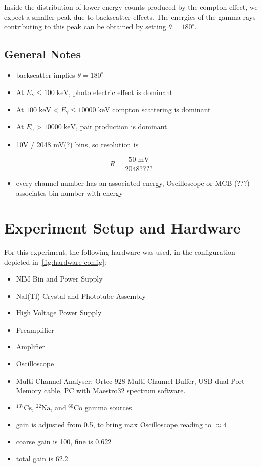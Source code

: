 \documentclass[a4paper]{article}
\begin{document}
Inside the distribution of lower energy counts produced by the compton effect, we expect a smaller peak due to backscatter effects. The energies of the gamma rays contributing to this peak can be obtained by setting $\theta=180^{\circ}$.



\subsection{General Notes}

\begin{itemize}
    \item backscatter implies $\theta=180^{\circ}$
    \item At $E_{\gamma}\leq100\mathrm{\;keV}$, photo electric effect is dominant
    \item At $100\mathrm{\;keV}<E_{\gamma}\leq10000\mathrm{\;keV}$ compton scattering is dominant
    \item At $E_{\gamma}>10000\mathrm{\;keV}$, pair production is dominant
    \item 10V / 2048 mV(?) bins, so resolution is
\end{itemize}
\begin{equation}
    R=\frac{50\;\mathrm{mV}}{2048????}
\end{equation}
\begin{itemize}
    \item every channel number has an associated energy, Oscilloscope or MCB (???) associates bin number with energy
\end{itemize}

\section{Experiment Setup and Hardware}

For this experiment, the following hardware was used, in the configuration depicted in~\autoref{fig:hardware-config}:
\begin{itemize}
    \item NIM Bin and Power Supply
    \item NaI(Tl) Crystal and Phototube Assembly
    \item High Voltage Power Supply
    \item Preamplifier
    \item Amplifier
    \item Oscilloscope
    \item Multi Channel Analyser: Ortec 928 Multi Channel Buffer, USB dual Port Memory cable, PC with Maestro32 spectrum software.
    \item $^{137}\mathrm{Cs}$, $^{22}\mathrm{Na}$, and $^{60}\mathrm{Co}$ gamma sources
    \item gain is adjusted from 0.5, to bring max Oscilloscope reading to $\approx4$
    \item coarse gain is 100, fine is 0.622
    \item total gain is 62.2
\end{itemize}
\end{document}
